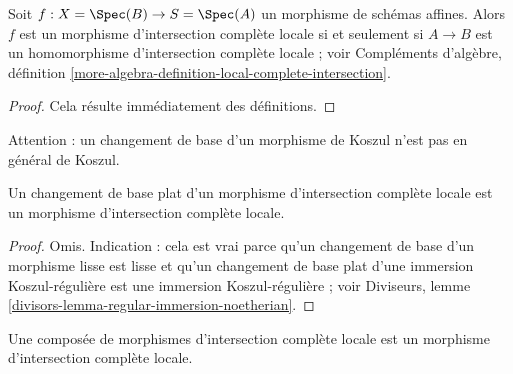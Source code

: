 \begin{lemma}
\label{lemma-affine-lci}
Soit $f : X = \Spec(B) \to S = \Spec(A)$ un morphisme de schémas affines.
Alors $f$ est un morphisme d'intersection complète locale si et seulement si
$A \to B$ est un homomorphisme d'intersection complète locale ; voir
Compléments d'algèbre, définition
\ref{more-algebra-definition-local-complete-intersection}.
\end{lemma}

\begin{proof}
Cela résulte immédiatement des définitions.
\end{proof}

\noindent
Attention : un changement de base d'un morphisme de Koszul n'est pas
en général de Koszul.

\begin{lemma}
\label{lemma-flat-base-change-lci}
Un changement de base plat d'un morphisme d'intersection complète locale est
un morphisme d'intersection complète locale.
\end{lemma}

\begin{proof}
Omis. Indication : cela est vrai parce qu'un changement de base d'un morphisme lisse
est lisse et qu'un changement de base plat d'une immersion Koszul-régulière est une
immersion Koszul-régulière ; voir
Diviseurs, lemme \ref{divisors-lemma-regular-immersion-noetherian}.
\end{proof}

\begin{lemma}
\label{lemma-composition-lci}
Une composée de morphismes d'intersection complète locale
est un morphisme d'intersection complète locale.
\end{lemma}

